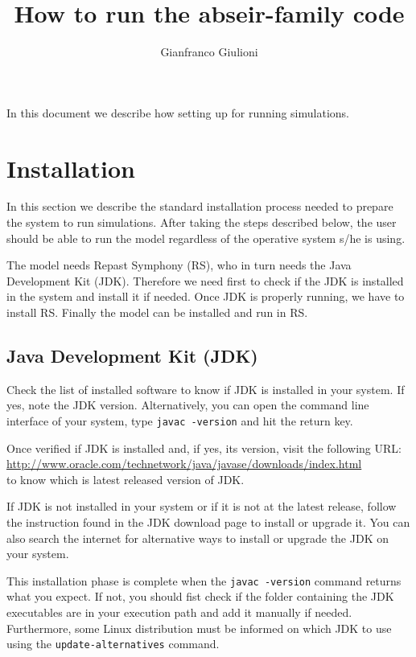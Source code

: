 \documentclass{article}
\title{How to run the abseir-family code}
\author{Gianfranco Giulioni}
\begin{document}
\maketitle


In this document we describe how setting up for running simulations. 
\section{Installation}

In this section we describe the standard installation process needed to prepare the system to run simulations. After taking the steps described below, the user should be able to run the model regardless of the operative system s/he is using.

The model needs Repast Symphony (RS), who in turn needs the Java Development Kit (JDK). Therefore we need first to check if the JDK is installed in the system and install it if needed. Once JDK is properly running, we have to install RS. Finally the model can be installed and run in RS.

\subsection{Java Development Kit (JDK)}

Check the list of installed software to know if JDK is installed in your system. If yes, note the JDK version.
Alternatively, you can open the command line interface of your system, type \verb+javac -version+ and hit the return key. 

Once verified if JDK is installed and, if yes, its version, visit the following URL:\\
\url{http://www.oracle.com/technetwork/java/javase/downloads/index.html}\\
to know which is latest released version of JDK.

If JDK is not installed in your system or if it is not at the latest release, follow the instruction found in the JDK download page to install or upgrade it. You can also search the internet for alternative ways to install or upgrade the JDK on your system.

This installation phase is complete when the \verb+javac -version+ command returns what you expect.
If not, you should fist check if the folder containing the JDK executables are in your execution path and add it manually if needed.
Furthermore, some Linux distribution must be informed on which JDK to use using the \verb+update-alternatives+ command. 
\end{document}

